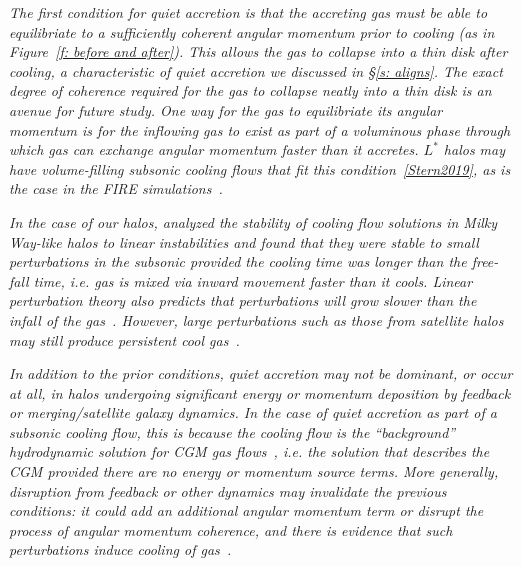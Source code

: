 \documentclass[fleqn,usenatbib]{mnras}
\begin{document}
\textit{
The first condition for quiet accretion is that the accreting gas must be able to equilibriate to a sufficiently coherent angular momentum prior to cooling (as in Figure~\ref{f: before and after}).
This allows the gas to collapse into a thin disk after cooling, a characteristic of quiet accretion we discussed in \S\ref{s: aligns}.
The exact degree of coherence required for the gas to collapse neatly into a thin disk is an avenue for future study.
One way for the gas to equilibriate its angular momentum is for the inflowing gas to exist as part of a voluminous phase through which gas can exchange angular momentum faster than it accretes.
$L^*$ halos may have volume-filling subsonic cooling flows that fit this condition~\ref{Stern2019}, as is the case in the FIRE simulations~\citep{Stern2020a}.
}

\textit{
In the case of our halos, \cite{Stern2019} analyzed the stability of cooling flow solutions in Milky Way-like halos to linear instabilities and found that they were stable to small perturbations in the subsonic provided the cooling time was longer than the free-fall time, i.e. gas is mixed via inward movement faster than it cools.
Linear perturbation theory also predicts that perturbations will grow slower than the infall of the gas~\citep[e.g.][]{Balbus1989}.
However, large perturbations such as those from satellite halos may still produce persistent cool gas~\citep{Esmerian2020}.
}

\textit{
In addition to the prior conditions, quiet accretion may not be dominant, or occur at all, in halos undergoing significant energy or momentum deposition by feedback or merging/satellite galaxy dynamics.
In the case of quiet accretion as part of a subsonic cooling flow, this is because the cooling flow is the ``background'' hydrodynamic solution for CGM gas flows~\cite{Stern2019}, i.e. the solution that describes the CGM provided there are no energy or momentum source terms.
More generally, disruption from feedback or other dynamics may invalidate the previous conditions: it could add an additional angular momentum term or disrupt the process of angular momentum coherence, and there is evidence that such perturbations induce cooling of gas~\citep[e.g.][]{Hummels2019, Esmerian2020}.
}
\end{document}
